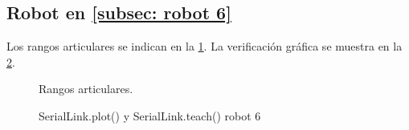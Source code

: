 \documentclass[a4paper,12pt]{article}
\begin{document}
\subsection{Robot en \cref{subsec: robot 6}}
Los rangos articulares se indican en la \cref{rangos kuka}. La verificación gráfica se muestra en la \cref{teach robot 6}.

\begin{figure}[htpb]
    \centering
    \begin{adjustbox}{scale = 0.5, max width=\columnwidth}
    \end{adjustbox}
    \caption{Rangos articulares.}
    \label{rangos kuka}
\end{figure}

\begin{figure}[htpb]
    \centering
    \begin{adjustbox}{max width=\columnwidth}
    \end{adjustbox}
    \caption{SerialLink.plot() y SerialLink.teach() robot 6}
    \label{teach robot 6}
\end{figure}
\end{document}
